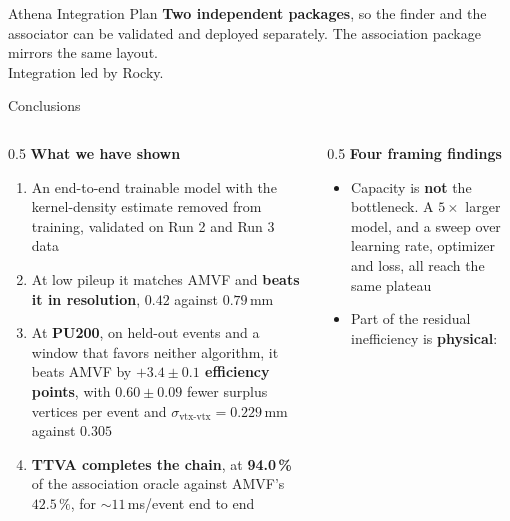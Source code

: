 \documentclass[xcolor=table,aspectratio=169]{beamer}
\begin{document}
\begin{frame}{Athena Integration Plan}
    \vspace{0.6em}
    {\small\textcolor{black!65}{\textbf{Two independent packages}, so the finder and the
    associator can be validated and deployed separately. The association package mirrors
    the same layout.}}\\[0.3em]
    {\scriptsize\textcolor{black!50}{Integration led by Rocky.}}
\end{frame}

\begin{frame}{Conclusions}
    \begin{columns}[t]
        \begin{column}{0.5\linewidth}
            \textbf{What we have shown}
            \begin{enumerate}
                \setlength\itemsep{0.4em}
                \item \small An end-to-end trainable model with the kernel-density
                    estimate removed from training, validated on Run 2 and Run 3 data
                \item \small At low pileup it matches AMVF and \textbf{beats it in
                    resolution}, $0.42$ against $0.79$\,mm
                \item \small At \textbf{PU200}, on held-out events and a window that
                    favors neither algorithm, it beats AMVF by
                    \textbf{$+3.4 \pm 0.1$ efficiency points}, with
                    $0.60 \pm 0.09$ fewer surplus vertices per event and
                    $\sigma_{\text{vtx-vtx}} = 0.229$\,mm against $0.305$
                \item \small \textbf{TTVA completes the chain}, at
                    \textbf{94.0\,\%} of the association oracle against AMVF's
                    $42.5\,\%$, for ${\sim}11$\,ms/event end to end
            \end{enumerate}
        \end{column}
        \begin{column}{0.5\linewidth}
            \textbf{Four framing findings}
            \begin{itemize}
                \setlength\itemsep{0.5em}
                \item \small Capacity is \textbf{not} the bottleneck. A $5\times$
                    larger model, and a sweep over learning rate, optimizer and loss,
                    all reach the same plateau
                \item \small Part of the residual inefficiency is \textbf{physical}:

\end{itemize}
\end{column}
\end{columns}
\end{frame}
\end{document}
